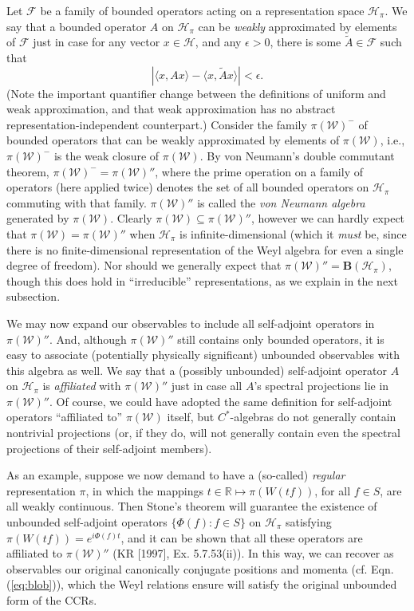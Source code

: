 \documentclass[12pt]{article}
\theoremstyle{remark}
\theoremstyle{definition}
\newcommand{\alg}[1]{\mathcal{#1}}
\newcommand{\hil}[1]{\mathcal{#1}}
\begin{document}
Let $\alg{F}$ be a family of bounded operators acting on a 
representation space
$\hil{H}_{\pi}$.  We say that a bounded operator $A$ on
$\hil{H}_{\pi}$ can be \emph{weakly} approximated by elements of
$\alg{F}$ just in case for any vector $x\in \hil{H}$, and any
$\epsilon >0$, there is some $\tilde{A}\in \alg{F}$ such that
\begin{equation} \left| \langle x,Ax\rangle -\langle x,\tilde{A}x\rangle
  \right| < \epsilon .
\end{equation}  (Note the important quantifier change between the
definitions of uniform and weak approximation, and that weak 
approximation has no abstract representation-independent counterpart.)  
Consider the family $\pi(\alg{W})^{-}$ of bounded operators that can be weakly 
approximated by elements of $\pi(\alg{W})$, i.e., $\pi(\alg{W})^{-}$ 
is 
the weak closure of $\pi(\alg{W})$.   By von Neumann's  
double commutant theorem, 
$\pi(\alg{W})^{-}=\pi(\alg{W})''$, where the prime operation on a family of 
operators (here applied twice) denotes the set of all bounded 
operators on $\hil{H}_{\pi}$ commuting with that family.    
$\pi(\alg{W})''$ is called the \emph{von Neumann algebra} generated 
by $\pi(\alg{W})$.  Clearly
$\pi(\alg{W})\subseteq \pi(\alg{W})''$, however we can hardly
expect that $\pi(\alg{W})=\pi(\alg{W})''$ when $\hil{H}_{\pi}$ is 
infinite-dimensional (which it \emph{must} be, since there is no 
finite-dimensional representation of the Weyl algebra for even a 
single degree of freedom).  Nor should we generally expect that 
$\pi(\alg{W})''=\mathbf{B}(\hil{H}_{\pi})$, though this does hold in ``irreducible'' 
representations, as we explain in the next subsection.

We may now expand our observables to include all self-adjoint 
operators in $\pi(\alg{W})''$.  And, although 
$\pi(\alg{W})''$ still contains only bounded operators, it
is easy to associate (potentially physically significant) 
unbounded observables with this algebra as well.  We 
say that a (possibly unbounded) self-adjoint operator $A$ on
$\hil{H}_{\pi}$ is \emph{affiliated} with $\pi(\alg{W})''$ just in case
all $A$'s spectral projections lie in $\pi(\alg{W})''$.  Of course, we 
could have adopted the same definition for self-adjoint operators 
``affiliated to'' $\pi(\alg{W})$  itself, but $C^{*}$-algebras do not 
generally contain nontrivial projections (or, if they do, will not 
generally contain even
the spectral projections of their self-adjoint 
members).

As an example, suppose 
we now demand to have a (so-called) \emph{regular} 
representation $\pi$, in which the mappings 
$t\in\mathbb{R}\mapsto \pi(W(tf))$, for all $f\in S$, are all weakly continuous. 
Then Stone's theorem will guarantee
 the existence 
of unbounded self-adjoint operators $\{\Phi(f):f\in S\}$ on $\hil{H}_{\pi}$ satisfying 
$\pi(W(tf))=e^{i\Phi(f)t}$, and it can be shown that all these 
operators are affiliated to $\pi(\alg{W})''$ (KR [1997], Ex. 5.7.53(ii)). 
In this way, we can recover 
as observables our original canonically conjugate positions and 
momenta (cf. Eqn. (\ref{eq:blob})), which the Weyl relations 
ensure will satisfy the original 
unbounded form of the CCRs.  
\end{document}
